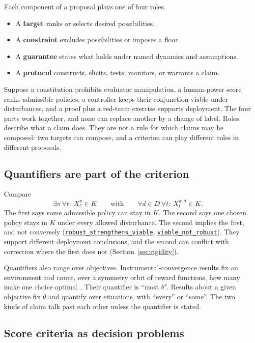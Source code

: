 \documentclass[11pt]{article}
\newcommand{\lean}[1]{\hyperref[lean:#1]{\nolinkurl{#1}}}
\begin{document}
Each component of a proposal plays one of four roles.
\begin{itemize}[leftmargin=1.5em,itemsep=0pt]
  \item A \textbf{target} ranks or selects desired possibilities.
  \item A \textbf{constraint} excludes possibilities or imposes a floor.
  \item A \textbf{guarantee} states what holds under named dynamics and assumptions.
  \item A \textbf{protocol} constructs, elicits, tests, monitors, or warrants a claim.
\end{itemize}
Suppose a constitution prohibits evaluator manipulation, a human-power score ranks admissible policies, a controller keeps their conjunction viable under disturbances, and a proof plus a red-team exercise supports deployment.
The four parts work together, and none can replace another by a change of label.
Roles describe what a claim does.
They are not a rule for which claims may be composed: two targets can compose, and a criterion can play different roles in different proposals.

\subsection{Quantifiers are part of the criterion}

Compare
\begin{equation}
\exists \pi\ \forall t:\ X_t^\pi\in K
\qquad\text{with}\qquad
\forall d\in D\ \forall t:\ X_t^{\pi,d}\in K.
\end{equation}
The first says some admissible policy can stay in $K$.
The second says one chosen policy stays in $K$ under every allowed disturbance.
The second implies the first, and not conversely (\lean{robust_strengthens_viable}, \lean{viable_not_robust}).
They support different deployment conclusions, and the second can conflict with correction where the first does not (Section~\ref{sec:rigidity}).

Quantifiers also range over objectives.
Instrumental-convergence results fix an environment and count, over a symmetry orbit of reward functions, how many make one choice optimal \parencite{turner2021seekpower,turner2022retargetable}.
Their quantifier is ``most $\theta$''.
Results about a given objective fix $\theta$ and quantify over situations, with ``every'' or ``some''.
The two kinds of claim talk past each other unless the quantifier is stated.

\subsection{Score criteria as decision problems}
\end{document}
